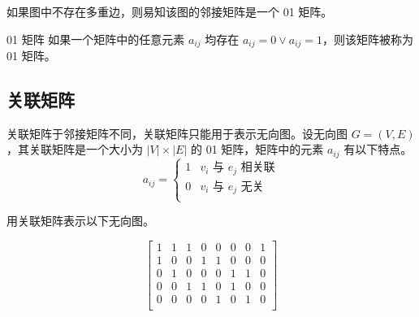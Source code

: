 如果图中不存在多重边，则易知该图的邻接矩阵是一个 01 矩阵。
\begin{info}{01 矩阵}
如果一个矩阵中的任意元素 $a_{ij}$ 均存在 $a_{ij}=0 \lor a_{ij}=1$，则该矩阵被称为 01 矩阵。
\end{info}

\subsection{关联矩阵}
关联矩阵于邻接矩阵不同，关联矩阵只能用于表示无向图。设无向图 $G=(V,E)$，其关联矩阵是一个大小为 $|V|\times|E|$ 的 01 矩阵，矩阵中的元素 $a_{ij}$ 有以下特点。
\begin{equation*}
    a_{ij}=
    \begin{cases}
        1 & \text{$v_i$ 与 $e_j$ 相关联} \\
        0 & \text{$v_i$ 与 $e_j$ 无关} \\
    \end{cases}
\end{equation*}

\begin{collections}
    \begin{example}
        用关联矩阵表示以下无向图。
        \vspace{-2em}
        \begin{center}
        \end{center}
    \end{example}
        \begin{solution}
            $$
            \begin{bmatrix}
                1 & 1 & 1 & 0 & 0 & 0 & 0 & 1 \\
                1 & 0 & 0 & 1 & 1 & 0 & 0 & 0 \\
                0 & 1 & 0 & 0 & 0 & 1 & 1 & 0 \\
                0 & 0 & 1 & 1 & 0 & 1 & 0 & 0 \\
                0 & 0 & 0 & 0 & 1 & 0 & 1 & 0 \\
            \end{bmatrix}
            $$
        \end{solution}
\end{collections}

\newpage